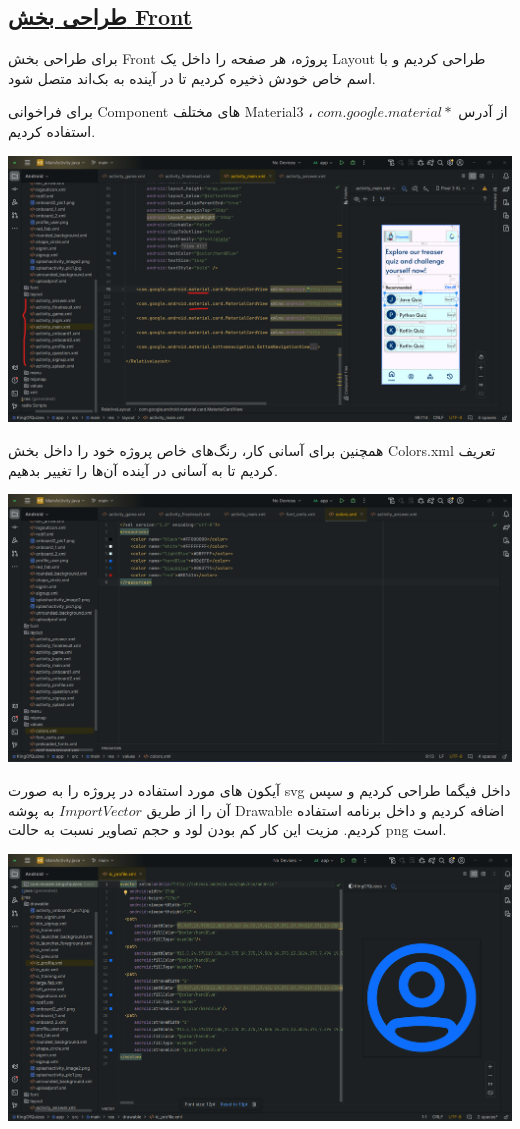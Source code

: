 \subsection*{\underline{طراحی بخش Front}}

برای طراحی بخش Front پروژه، هر صفحه را داخل یک Layout طراحی کردیم و با اسم خاص خودش ذخیره کردیم تا در آینده به بک‌اند متصل شود. 

برای فراخوانی Component های مختلف Material3 ، از آدرس 
$com.google.material*$
استفاده کردیم.

\includegraphics[width=1\linewidth]{screenshot001}


همچنین برای آسانی کار، رنگ‌های خاص پروژه خود را داخل بخش Colors.xml تعریف کردیم تا به آسانی در آینده آن‌ها را تغییر بدهیم.

\includegraphics[width=1\linewidth]{screenshot002}

\pagebreak


آیکون های مورد استفاده در پروژه را به صورت svg داخل فیگما طراحی کردیم و سپس آن را از طریق 
$Import Vector$
به پوشه Drawable اضافه کردیم و داخل برنامه استفاده کردیم. مزیت این کار کم بودن لود و حجم تصاویر نسبت به حالت png است.

	\includegraphics[width=1\linewidth]{screenshot003}



